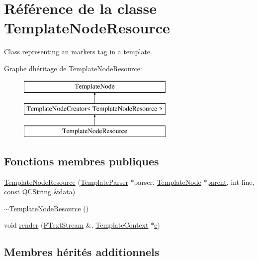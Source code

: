 \hypertarget{class_template_node_resource}{}\section{Référence de la classe Template\+Node\+Resource}
\label{class_template_node_resource}


Class representing an \textquotesingle{}markers\textquotesingle{} tag in a template.  


Graphe d\textquotesingle{}héritage de Template\+Node\+Resource\+:\begin{figure}[H]
\begin{center}
\leavevmode
\includegraphics[height=3.000000cm]{class_template_node_resource}
\end{center}
\end{figure}
\subsection*{Fonctions membres publiques}
\begin{DoxyCompactItemize}
\item 
\hyperlink{class_template_node_resource_ab4b340ee844ed38c081dfedd825b1b46}{Template\+Node\+Resource} (\hyperlink{class_template_parser}{Template\+Parser} $\ast$parser, \hyperlink{class_template_node}{Template\+Node} $\ast$\hyperlink{class_template_node_a69a306ef84e62af9fe57bf9aacc94536}{parent}, int line, const \hyperlink{class_q_c_string}{Q\+C\+String} \&data)
\item 
\hyperlink{class_template_node_resource_a2cd53a2bec7b0737030422bd40a2c906}{$\sim$\+Template\+Node\+Resource} ()
\item 
void \hyperlink{class_template_node_resource_a94b14f701199ae76e5a6c574e34c5591}{render} (\hyperlink{class_f_text_stream}{F\+Text\+Stream} \&, \hyperlink{class_template_context}{Template\+Context} $\ast$\hyperlink{060__command__switch_8tcl_ab14f56bc3bd7680490ece4ad7815465f}{c})
\end{DoxyCompactItemize}
\subsection*{Membres hérités additionnels}


